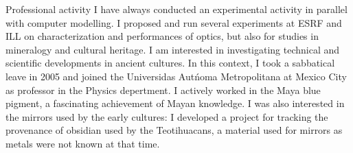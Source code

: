 \begin{rubric}{Professional activity}
I have always conducted an experimental activity in parallel with computer
modelling. I proposed and run several experiments at ESRF and ILL on characterization and performances of optics, but also for studies in mineralogy and cultural heritage. I am interested in investigating technical and scientific developments in ancient cultures. In this context, I took a sabbatical leave in 2005 and joined the Universidas Aut\'noma Metropolitana at Mexico City as professor in the Physics depertment. I actively worked in the Maya blue pigment, a fascinating achievement of Mayan knowledge. 
I was also interested in the mirrors used by the early cultures: I developed a project for tracking the provenance of obsidian used by the Teotihuacans, a material used for mirrors as metals were not known at that time.








\end{rubric}
